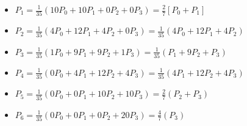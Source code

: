 \documentclass{report}
\begin{document}
\begin{itemize}
{\begin{itemize}
\begin{itemize}
				\item $P_1 = \frac{1}{35}(10P_0 + 10P_1 + 0P_2  + 0P_3) = \frac{2}{7}[P_0 + P_1]$ 
				\item $P_2 = \frac{1}{35}(4P_0  + 12P_1 + 4P_2  + 0P_3) = \frac{1}{35}(4P_0  + 12P_1 + 4P_2)$
				\item $P_3 = \frac{1}{35}(1P_0  + 9P_1 + 9P_2  + 1P_3) = \frac{1}{35}(P_1  + 9P_2 + P_3)$
				\item $P_4 = \frac{1}{35}(0P_0  + 4P_1 + 12P_2  + 4P_3) = \frac{1}{35}(4P_1  + 12P_2 + 4P_3)$
				\item $P_5 = \frac{1}{35}(0P_0  + 0P_1 + 10P_2  + 10P_3) = \frac{2}{7}(P_2 + P_3)$
				\item $P_6 = \frac{1}{35}(0P_0  + 0P_1 + 0P_2  + 20P_3) = \frac{4}{7}(P_3)$
			\end{itemize}
			
			
		\end{itemize}}
\end{itemize}
\end{document}
